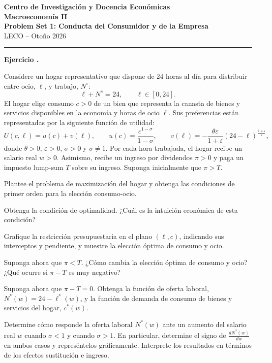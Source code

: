\documentclass[11pt]{article}
\let\enumerateoriginal\enumerate
\let\endenumerateoriginal\endenumerate
\renewenvironment{enumerate}{%
  \enumerateoriginal
  \setlength{\itemsep}{0.35em}%
  \setlength{\parsep}{0pt}%
  \setlength{\topsep}{0.35em}%
}{\endenumerateoriginal}
\newcounter{problema}
\newenvironment{problema}[1]{%
  \par
  \refstepcounter{problema}%
  \addvspace{0.9em}%
  \noindent\textbf{Ejercicio \theproblema.}
}{\par}
\begin{document}
\begin{center}
  {\large\textbf{Centro de Investigación y Docencia Económicas}}\\[0.25em]
  {\large\textbf{Macroeconomía II}}\\[0.2em]
  {\large\textbf{Problem Set 1: Conducta del Consumidor y de la Empresa}}\\[0.35em]
  LECO -- Otoño 2026
\end{center}

\vspace{0.6em}
\hrule
\vspace{0.6em}


\begin{problema}{Oferta de trabajo y demanda de consumo}
Considere un hogar representativo que dispone de 24 horas al día para distribuir entre ocio, $\ell$, y trabajo, $N^s$:
\[
    \ell+N^s=24,
    \qquad
    \ell\in[0,24].
\]
El hogar elige consumo $c>0$ de un bien que representa la canasta de bienes y servicios disponibles en la economía y horas de ocio $\ell$. Sus preferencias están representadas por la siguiente función de utilidad:
\[
    U(c,\ell)=u(c)+v(\ell),
    \qquad
    u(c)=\frac{c^{1-\sigma}}{1-\sigma},
    \qquad
    v(\ell)=-\frac{\theta\varepsilon}{1+\varepsilon}
    (24-\ell)^{\frac{1+\varepsilon}{\varepsilon}},
\]
donde $\theta>0$, $\varepsilon>0$, $\sigma>0$ y $\sigma\neq 1$. Por cada hora trabajada, el hogar recibe un salario real $w>0$. Asimismo, recibe un ingreso por dividendos $\pi>0$ y paga un impuesto lump-sum $T$ sobre su ingreso. Suponga inicialmente que $\pi>T$.

\begin{enumerate}
    \item Plantee el problema de maximización del hogar y obtenga las condiciones de primer orden para la elección consumo-ocio.

    \item Obtenga la condición de optimalidad. ¿Cuál es la intuición económica de esta condición?

    \item Grafique la restricción presupuestaria en el plano $(\ell,c)$, indicando sus interceptos y pendiente, y muestre la elección óptima de consumo y ocio.

    \item Suponga ahora que $\pi<T$. ¿Cómo cambia la elección óptima de consumo y ocio? ¿Qué ocurre si $\pi-T$ es muy negativo?

    \item Suponga ahora que $\pi-T=0$. Obtenga la función de oferta laboral, $N^*(w)=24-\ell^*(w)$, y la función de demanda de consumo de bienes y servicios del hogar, $c^*(w)$.

    \item Determine cómo responde la oferta laboral $N^*(w)$ ante un aumento del salario real $w$ cuando $\sigma<1$ y cuando $\sigma>1$. En particular, determine el signo de $\frac{dN^*(w)}{dw}$ en ambos casos y represéntelos gráficamente. Interprete los resultados en términos de los efectos sustitución e ingreso.
\end{enumerate}
\end{problema}
\end{document}
